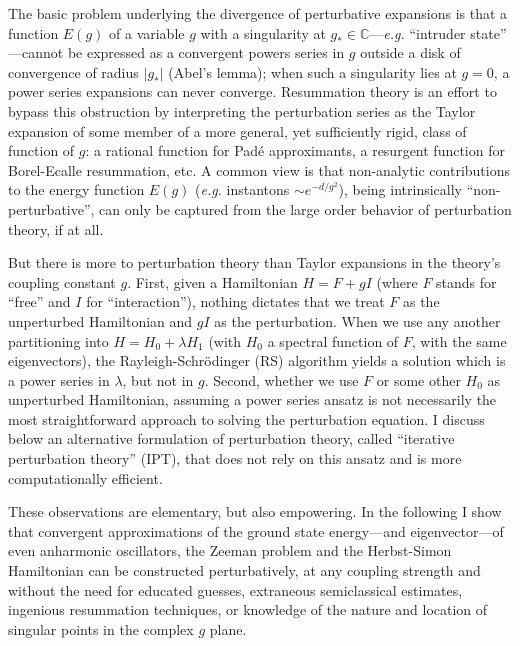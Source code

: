 \documentclass[aps,prl,reprint]{revtex4-2}
\begin{document}
	The basic problem underlying the divergence of perturbative expansions is that a function $E(g)$ of a variable $g$ with a singularity at $g_*\in\mathbb{C}$---\emph{e.g.} ``intruder state'' \cite{ChoeIdentifyingremovingintruder2001}---cannot be expressed as a convergent powers series in $g$ outside a disk of convergence of radius $\vert g_* \vert$ (Abel's lemma); when such a singularity lies at $g=0$, a power series expansions can never converge. Resummation theory is an effort to bypass this obstruction by interpreting the perturbation series as the Taylor expansion of some member of a more general, yet sufficiently rigid, class of function of $g$: a rational function for Padé approximants, a resurgent function for Borel-Ecalle resummation, etc. A common view is that non-analytic contributions to the energy function $E(g)$ (\emph{e.g.} instantons $\sim e^{-d/g^2}$), being intrinsically ``non-perturbative'', can only be captured from the large order behavior of perturbation theory, if at all.

	But there is more to perturbation theory than Taylor expansions in the theory's coupling constant $g$. First, given a Hamiltonian $H = F + g I$ (where $F$ stands for ``free'' and $I$ for ``interaction''), nothing dictates that we treat $F$ as the unperturbed Hamiltonian and $gI$ as the perturbation. When we use any another partitioning into $H = H_0 + \lambda H_1$ (with $H_0$ a spectral function of $F$, with the same eigenvectors), the Rayleigh-Schr\"odinger (RS) algorithm yields a solution which is a power series in $\lambda$, but not in $g$. Second, whether we use $F$ or some other $H_0$ as unperturbed Hamiltonian, assuming a power series ansatz is not necessarily the most straightforward approach to solving the perturbation equation. I discuss below an alternative formulation of perturbation theory, called ``iterative perturbation theory'' (IPT), that does not rely on this ansatz and is more computationally efficient.

	These observations are elementary, but also empowering. In the following I show that convergent approximations of the ground state energy---and eigenvector---of even anharmonic oscillators, the Zeeman problem and the Herbst-Simon Hamiltonian can be constructed perturbatively, at any coupling strength and without the need for educated guesses, extraneous semiclassical estimates, ingenious resummation techniques, or knowledge of the nature and location of singular points in the complex $g$ plane.
\end{document}
